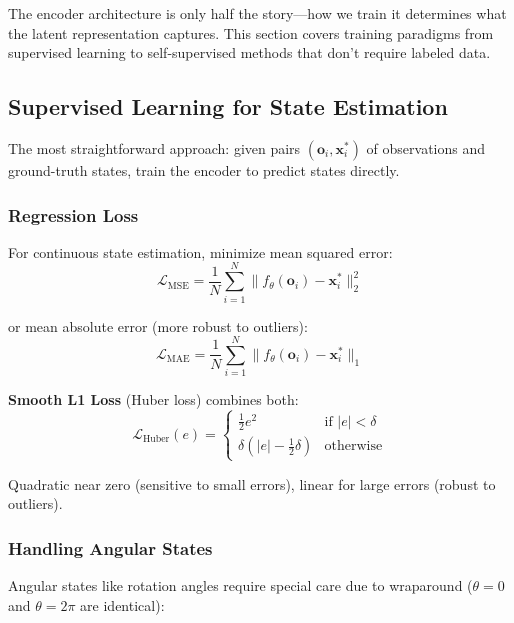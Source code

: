 The encoder architecture is only half the story---how we train it determines what the latent representation captures. This section covers training paradigms from supervised learning to self-supervised methods that don't require labeled data.

\subsection{Supervised Learning for State Estimation}

The most straightforward approach: given pairs $(\mathbf{o}_i, \mathbf{x}_i^*)$ of observations and ground-truth states, train the encoder to predict states directly.

\subsubsection{Regression Loss}

For continuous state estimation, minimize mean squared error:
\begin{equation}
\mathcal{L}_{\text{MSE}} = \frac{1}{N} \sum_{i=1}^{N} \| f_\theta(\mathbf{o}_i) - \mathbf{x}_i^* \|_2^2
\label{eq:mse_loss}
\end{equation}

or mean absolute error (more robust to outliers):
\begin{equation}
\mathcal{L}_{\text{MAE}} = \frac{1}{N} \sum_{i=1}^{N} \| f_\theta(\mathbf{o}_i) - \mathbf{x}_i^* \|_1
\label{eq:mae_loss}
\end{equation}

\textbf{Smooth L1 Loss} (Huber loss) combines both:
\begin{equation}
\mathcal{L}_{\text{Huber}}(e) = \begin{cases}
\frac{1}{2} e^2 & \text{if } |e| < \delta \\
\delta (|e| - \frac{1}{2}\delta) & \text{otherwise}
\end{cases}
\label{eq:huber_loss}
\end{equation}

Quadratic near zero (sensitive to small errors), linear for large errors (robust to outliers).

\subsubsection{Handling Angular States}

Angular states like rotation angles require special care due to wraparound ($\theta = 0$ and $\theta = 2\pi$ are identical):

